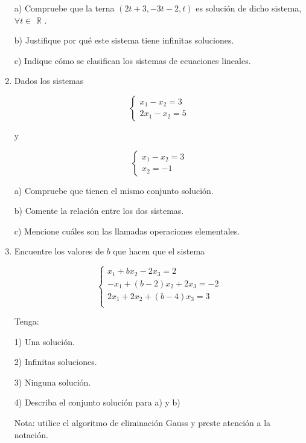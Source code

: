 \begin{enumerate}
a) Compruebe que la terna $(2t + 3, -3t -2, t)$  es solución de dicho sistema, $\forall t \in$ $\mathbb{R}$ .

b) Justifique por qué este sistema tiene infinitas soluciones.

c) Indique cómo se clasifican los sistemas de ecuaciones lineales.


  
  

\item

Dados los sistemas 

\[
\left\{
\begin{array}{ll}
x_1 - x_2 = 3\\
2x_1 - x_2= 5
\end{array}
\right.
\]

y 

\[
\left\{
\begin{array}{ll}
x_1 - x_2 = 3 \\
      x_2 = -1
\end{array}
\right.
\]

a) Compruebe que tienen el mismo conjunto solución.

b) Comente la relación entre los dos sistemas.

c) Mencione cuáles son las llamadas operaciones elementales.

\bigskip


\item

Encuentre los valores de $b$ que hacen que el sistema


\[
\left\{
\begin{array}{ll}
x_1 + bx_2 - 2x_3 = 2 \\
-x_1 + (b-2)x_2 + 2x_3= -2\\
2x_1 + 2x_2 + (b-4)x_3= 3\\
\end{array}
\right.
\]

Tenga:

\bigskip


1) Una solución.

2) Infinitas soluciones.

3) Ninguna solución.

4) Describa el conjunto solución para a) y b)

\bigskip

Nota: utilice el algoritmo de eliminación Gauss y preste atención a la notación.

 \bigskip
  

\end{enumerate}
